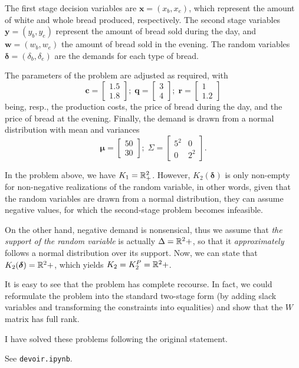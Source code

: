 \documentclass[a4paper]{report}
\begin{document}
The first stage decision variables are $\bm{x}= (x_b,x_e)$, which represent the amount of white and whole bread produced, respectively.
The second stage variables $\bm{y}=(y_b,y_e)$ represent the amount of bread sold during the day, and $\bm{w}=(w_b,w_e)$ the amount of bread sold in the evening.
The random variables $\bm{\delta}=(\delta_b,\delta_e)$ are the demands for each type of bread.

The parameters of the problem are adjusted as required, with \[
\bm{c} = \begin{bmatrix} 1.5 \\ 1.8 \end{bmatrix} ;\; \bm{q} = \begin{bmatrix} 3 \\ 4 \end{bmatrix} ;\; \bm{r} = \begin{bmatrix} 1 \\ 1.2 \end{bmatrix} 
\] being, resp., the production costs, the price of bread during the day, and the price of bread at the evening.
Finally, the demand is drawn from a normal distribution with mean and variances \[
    \bm{\mu} = \begin{bmatrix} 50 \\ 30 \end{bmatrix} ;\; \Sigma = \begin{bmatrix} 5^2 & 0 \\ 0 & 2^2 \end{bmatrix} 
.\] 


In the problem above, we have $K_1 = \mathbb{R}^{2}_+$.
However, $K_2(\bm{\delta})$ is only non-empty for non-negative realizations of the random variable, in other words, given that the random variables are drawn from a normal distribution, they can assume negative values, for which the second-stage problem becomes infeasible.

On the other hand, negative demand is nonsensical, thus we assume that \emph{the support of the random variable} is actually $\Delta = \mathbb{R}^{2}+$, so that it \emph{approximately} follows a normal distribution over its support.
Now, we can state that $K_2(\bm{\delta}) = \mathbb{R}^{2}+$, which yields $K_2 = K_2^{P} = \mathbb{R}^{2}+$.

It is easy to see that the problem has complete recourse.
In fact, we could reformulate the problem into the standard two-stage form (by adding slack variables and transforming the constraints into equalities) and show that the $W$ matrix has full rank.


I have solved these problems following the original statement.

See \texttt{devoir.ipynb}.
\end{document}
